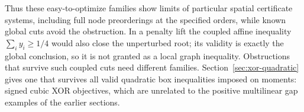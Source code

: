 Thus these easy-to-optimize families show limits of particular spatial
certificate systems, including full node preorderings at the specified
orders, while known global cuts avoid the obstruction. In a penalty lift
the coupled affine inequality $\sum_i y_i\ge1/4$ would also close the
unperturbed root; its validity is exactly the global conclusion, so it is
not granted as a local graph inequality. Obstructions that survive
such coupled cuts need different families. Section~\ref{sec:xor-quadratic}
gives one that survives all valid quadratic box inequalities imposed on
moments: signed cubic XOR objectives, which are unrelated to the positive
multilinear gap examples of the earlier sections.
